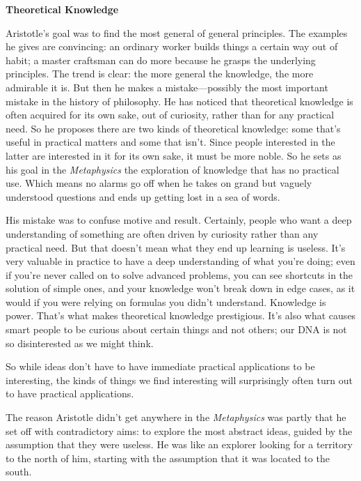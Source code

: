 \documentclass[12pt]{book}
\begin{document}
\textbf{Theoretical Knowledge}

Aristotle's goal was to find the most general of general principles. The
examples he gives are convincing: an ordinary worker builds things a
certain way out of habit; a master craftsman can do more because he
grasps the underlying principles. The trend is clear: the more general
the knowledge, the more admirable it is. But then he makes a
mistake---possibly the most important mistake in the history of
philosophy. He has noticed that theoretical knowledge is often acquired
for its own sake, out of curiosity, rather than for any practical need.
So he proposes there are two kinds of theoretical knowledge: some that's
useful in practical matters and some that isn't. Since people interested
in the latter are interested in it for its own sake, it must be more
noble. So he sets as his goal in the \emph{Metaphysics} the exploration
of knowledge that has no practical use. Which means no alarms go off
when he takes on grand but vaguely understood questions and ends up
getting lost in a sea of words.

His mistake was to confuse motive and result. Certainly, people who want
a deep understanding of something are often driven by curiosity rather
than any practical need. But that doesn't mean what they end up learning
is useless. It's very valuable in practice to have a deep understanding
of what you're doing; even if you're never called on to solve advanced
problems, you can see shortcuts in the solution of simple ones, and your
knowledge won't break down in edge cases, as it would if you were
relying on formulas you didn't understand. Knowledge is power. That's
what makes theoretical knowledge prestigious. It's also what causes
smart people to be curious about certain things and not others; our DNA
is not so disinterested as we might think.

So while ideas don't have to have immediate practical applications to be
interesting, the kinds of things we find interesting will surprisingly
often turn out to have practical applications.

The reason Aristotle didn't get anywhere in the \emph{Metaphysics} was
partly that he set off with contradictory aims: to explore the most
abstract ideas, guided by the assumption that they were useless. He was
like an explorer looking for a territory to the north of him, starting
with the assumption that it was located to the south.
\end{document}
